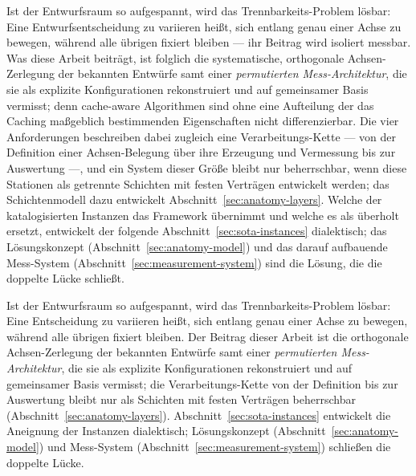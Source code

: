\begin{nurlang}
Ist der Entwurfsraum so aufgespannt, wird das Trennbarkeits-Problem lösbar: Eine Entwurfsentscheidung zu
variieren heißt, sich entlang genau einer Achse zu bewegen, während alle übrigen fixiert bleiben --- ihr
Beitrag wird isoliert messbar. Was diese Arbeit beiträgt, ist folglich die systematische, orthogonale
Achsen-Zerlegung der bekannten Entwürfe samt einer \emph{permutierten Mess-Architektur}, die sie als
explizite Konfigurationen rekonstruiert und auf gemeinsamer Basis vermisst; denn cache-aware Algorithmen
sind ohne eine Aufteilung der das Caching maßgeblich bestimmenden Eigenschaften nicht differenzierbar.
Die vier Anforderungen beschreiben dabei zugleich eine Verarbeitungs-Kette --- von der Definition einer
Achsen-Belegung über ihre Erzeugung und Vermessung bis zur Auswertung ---, und ein System dieser Größe
bleibt nur beherrschbar, wenn diese Stationen als getrennte Schichten mit festen Verträgen entwickelt
werden; das Schichtenmodell dazu entwickelt Abschnitt~\ref{sec:anatomy-layers}. Welche der
katalogisierten Instanzen das Framework übernimmt und welche es als überholt ersetzt, entwickelt der
folgende Abschnitt~\ref{sec:sota-instances} dialektisch; das Lösungskonzept
(Abschnitt~\ref{sec:anatomy-model}) und das darauf aufbauende Mess-System
(Abschnitt~\ref{sec:measurement-system}) sind die Lösung, die die doppelte Lücke schließt.
\end{nurlang}
\begin{nurkurz}
Ist der Entwurfsraum so aufgespannt, wird das Trennbarkeits-Problem lösbar: Eine Entscheidung zu variieren
heißt, sich entlang genau einer Achse zu bewegen, während alle übrigen fixiert bleiben. Der Beitrag dieser
Arbeit ist die orthogonale Achsen-Zerlegung der bekannten Entwürfe samt einer \emph{permutierten
Mess-Architektur}, die sie als explizite Konfigurationen rekonstruiert und auf gemeinsamer Basis vermisst; die
Verarbeitungs-Kette von der Definition bis zur Auswertung bleibt nur als Schichten mit festen Verträgen
beherrschbar (Abschnitt~\ref{sec:anatomy-layers}). Abschnitt~\ref{sec:sota-instances} entwickelt die Aneignung
der Instanzen dialektisch; Lösungskonzept (Abschnitt~\ref{sec:anatomy-model}) und Mess-System
(Abschnitt~\ref{sec:measurement-system}) schließen die doppelte Lücke.
\end{nurkurz}

